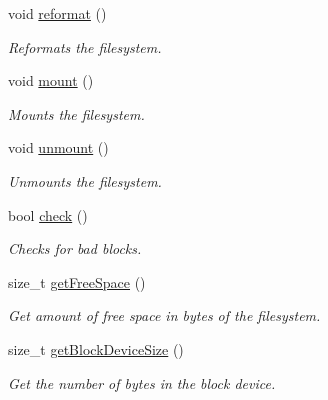 \begin{DoxyCompactItemize}
\mbox{\label{class_sat_file_handler_ad36c9457caeb65eed6418190aa8565e2}} 
void \mbox{\hyperlink{class_sat_file_handler_ad36c9457caeb65eed6418190aa8565e2}{reformat}} ()
\begin{DoxyCompactList}\small\item\em Reformats the filesystem. \end{DoxyCompactList}\item 
\mbox{\label{class_sat_file_handler_a4b0bc1aeabc8d1230aadec9ad1207e3d}} 
void \mbox{\hyperlink{class_sat_file_handler_a4b0bc1aeabc8d1230aadec9ad1207e3d}{mount}} ()
\begin{DoxyCompactList}\small\item\em Mounts the filesystem. \end{DoxyCompactList}\item 
\mbox{\label{class_sat_file_handler_a3281befca1d7df2e4035cec885c161ae}} 
void \mbox{\hyperlink{class_sat_file_handler_a3281befca1d7df2e4035cec885c161ae}{unmount}} ()
\begin{DoxyCompactList}\small\item\em Unmounts the filesystem. \end{DoxyCompactList}\item 
\mbox{\label{class_sat_file_handler_ad404c0cfc5ee0fea8d19b6be6627954d}} 
bool \mbox{\hyperlink{class_sat_file_handler_ad404c0cfc5ee0fea8d19b6be6627954d}{check}} ()
\begin{DoxyCompactList}\small\item\em Checks for bad blocks. \end{DoxyCompactList}\item 
size\+\_\+t \mbox{\hyperlink{class_sat_file_handler_ae4b0b4244befa3a3d1fdfc451ae248f0}{get\+Free\+Space}} ()
\begin{DoxyCompactList}\small\item\em Get amount of free space in bytes of the filesystem. \end{DoxyCompactList}\item 
size\+\_\+t \mbox{\hyperlink{class_sat_file_handler_a1a01017636190f9c3e14633564468882}{get\+Block\+Device\+Size}} ()
\begin{DoxyCompactList}\small\item\em Get the number of bytes in the block device. \end{DoxyCompactList}\item 

\end{DoxyCompactItemize}
